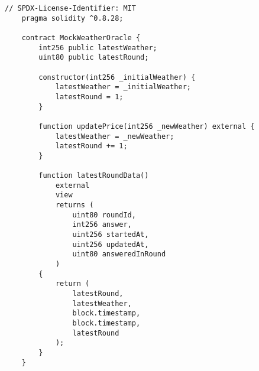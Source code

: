 	\begin{lstlisting}[style=soliditystyle, caption={MockWeatherOracle.sol - Mock Weather Data Oracle},label={lst:lstlisting}]
    // SPDX-License-Identifier: MIT
    pragma solidity ^0.8.28;

    contract MockWeatherOracle {
        int256 public latestWeather;
        uint80 public latestRound;

        constructor(int256 _initialWeather) {
            latestWeather = _initialWeather;
            latestRound = 1;
        }

        function updatePrice(int256 _newWeather) external {
            latestWeather = _newWeather;
            latestRound += 1;
        }

        function latestRoundData()
            external
            view
            returns (
                uint80 roundId,
                int256 answer,
                uint256 startedAt,
                uint256 updatedAt,
                uint80 answeredInRound
            )
        {
            return (
                latestRound,
                latestWeather,
                block.timestamp,
                block.timestamp,
                latestRound
            );
        }
    }
    \end{lstlisting}